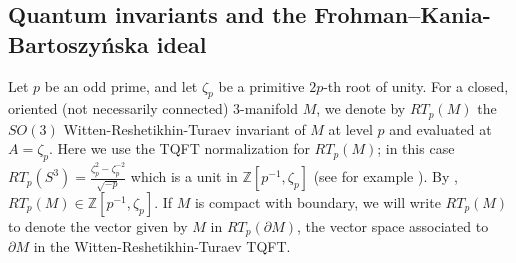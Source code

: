 \documentclass[12pt]{amsart}
\theoremstyle{definition}
\newcommand{\Z}{\mathbb{Z}}
\begin{document}
\subsection{Quantum invariants and the Frohman--Kania-Bartoszy\'nska ideal}
\label{sec:FKBideals}
Let $p$ be an odd prime, and let $\zeta_p$ be a primitive $2p$-th root of unity. For a closed, oriented (not necessarily connected) $3$-manifold $M$, we denote by $RT_p(M)$ the $SO(3)$ Witten-Reshetikhin-Turaev invariant of $M$ at level $p$ and evaluated at $A=\zeta_p$. Here we use the TQFT normalization for $RT_p(M)$; in this case $RT_p(S^3)=\frac{\zeta_p^2-\zeta_p^{-2}}{\sqrt{-p}}$ which is a unit in $\Z\left[p^{-1},\zeta_p\right]$ (see for example \cite[Lemma 4.1(ii)]{GMvW}). By \cite{MR97}, $RT_p(M)\in \Z[p^{-1},\zeta_p]$. If $M$ is compact with boundary, we will write $RT_p(M)$ to denote the vector given by $M$ in $RT_p(\partial M)$, the vector space associated to $\partial M$ in the Witten-Reshetikhin-Turaev TQFT.
\end{document}
